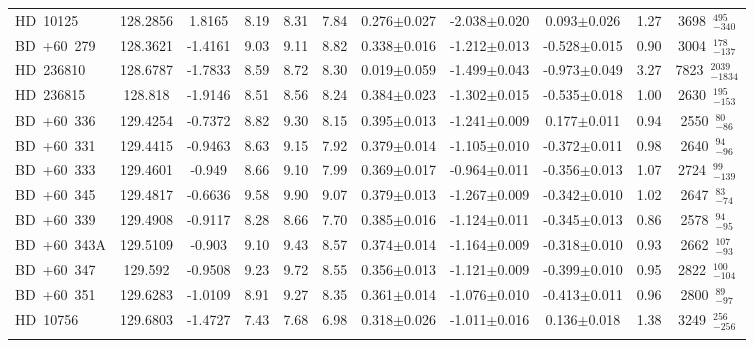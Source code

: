 {\begin{longtable}{lcccccccccc}
HD~10125 & 128.2856 & 1.8165 & 8.19 & 8.31 & 7.84 & 0.276$\pm$0.027 & -2.038$\pm$0.020 & 0.093$\pm$0.026 & 1.27 & 3698~$_{-340}^{495}$ \\
\noalign{\smallskip}
BD~+60~279 & 128.3621 & -1.4161 & 9.03 & 9.11 & 8.82 & 0.338$\pm$0.016 & -1.212$\pm$0.013 & -0.528$\pm$0.015 & 0.90 & 3004~$_{-137}^{178}$ \\
\noalign{\smallskip}
HD~236810 & 128.6787 & -1.7833 & 8.59 & 8.72 & 8.30 & 0.019$\pm$0.059 & -1.499$\pm$0.043 & -0.973$\pm$0.049 & 3.27 & 7823~$_{-1834}^{2039}$ \\
\noalign{\smallskip}
HD~236815 & 128.818 & -1.9146 & 8.51 & 8.56 & 8.24 & 0.384$\pm$0.023 & -1.302$\pm$0.015 & -0.535$\pm$0.018 & 1.00 & 2630~$_{-153}^{195}$ \\
\noalign{\smallskip}
BD~+60~336 & 129.4254 & -0.7372 & 8.82 & 9.30 & 8.15 & 0.395$\pm$0.013 & -1.241$\pm$0.009 & 0.177$\pm$0.011 & 0.94 & 2550~$_{-86}^{80}$ \\
\noalign{\smallskip}
BD~+60~331 & 129.4415 & -0.9463 & 8.63 & 9.15 & 7.92 & 0.379$\pm$0.014 & -1.105$\pm$0.010 & -0.372$\pm$0.011 & 0.98 & 2640~$_{-96}^{94}$ \\
\noalign{\smallskip}
BD~+60~333 & 129.4601 & -0.949 & 8.66 & 9.10 & 7.99 & 0.369$\pm$0.017 & -0.964$\pm$0.011 & -0.356$\pm$0.013 & 1.07 & 2724~$_{-139}^{99}$ \\
\noalign{\smallskip}
BD~+60~345 & 129.4817 & -0.6636 & 9.58 & 9.90 & 9.07 & 0.379$\pm$0.013 & -1.267$\pm$0.009 & -0.342$\pm$0.010 & 1.02 & 2647~$_{-74}^{83}$ \\
\noalign{\smallskip}
BD~+60~339 & 129.4908 & -0.9117 & 8.28 & 8.66 & 7.70 & 0.385$\pm$0.016 & -1.124$\pm$0.011 & -0.345$\pm$0.013 & 0.86 & 2578~$_{-95}^{94}$ \\
\noalign{\smallskip}
BD~+60~343A & 129.5109 & -0.903 & 9.10 & 9.43 & 8.57 & 0.374$\pm$0.014 & -1.164$\pm$0.009 & -0.318$\pm$0.010 & 0.93 & 2662~$_{-93}^{107}$ \\
\noalign{\smallskip}
BD~+60~347 & 129.592 & -0.9508 & 9.23 & 9.72 & 8.55 & 0.356$\pm$0.013 & -1.121$\pm$0.009 & -0.399$\pm$0.010 & 0.95 & 2822~$_{-104}^{100}$ \\
\noalign{\smallskip}
BD~+60~351 & 129.6283 & -1.0109 & 8.91 & 9.27 & 8.35 & 0.361$\pm$0.014 & -1.076$\pm$0.010 & -0.413$\pm$0.011 & 0.96 & 2800~$_{-97}^{89}$ \\
\noalign{\smallskip}
HD~10756 & 129.6803 & -1.4727 & 7.43 & 7.68 & 6.98 & 0.318$\pm$0.026 & -1.011$\pm$0.016 & 0.136$\pm$0.018 & 1.38 & 3249~$_{-256}^{256}$ \\
\noalign{\smallskip}

\end{longtable}}
